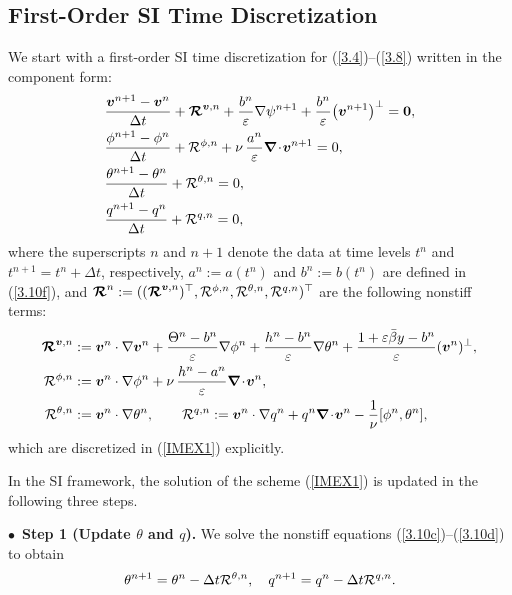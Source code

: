 \documentclass[a4paper,11pt,twoside]{article}
\numberwithin{equation}{section}
\numberwithin{figure}{section}
\numberwithin{table}{section}
\newcommand{\bnabla}{\bm{\nabla}}
\newcommand{\eps}{\varepsilon}
\newcommand{\dt}{\Delta t}
\newcommand{\bv}{\bm{v}}
\newcommand\eref[1]{(\ref{#1})}
\begin{document}
\subsection{First-Order SI Time Discretization}\label{sec32}
We start with a first-order SI time discretization for \eref{3.4}--\eref{3.8} written in the component form:
\begin{subequations}
\begin{align}
&\frac{\bv^{n+1}-\bv^n}{\dt}+\bm{{\cal R}}^{\bv,n}+\frac{b^n}{\eps}\nabla\psi^{n+1}+\frac{b^n}{\eps}\big(\bv^{n+1}\big)^\perp=\bm0,
\label{3.10a}\\
&\frac{\phi^{n+1}-\phi^n}{\dt}+{\cal R}^{\phi,n}+\nu\,\frac{a^n}{\eps}\bnabla\!\cdot\!\bv^{n+1}=0,\label{3.10b}\\
&\frac{\theta^{n+1}-\theta^n}{\dt}+{\cal R}^{\theta,n}=0,\label{3.10c}\\
&\frac{q^{n+1}-q^n}{\dt}+{\cal R}^{q,n}=0,\label{3.10d}
\end{align}
\label{IMEX1}
\end{subequations}
where the superscripts $n$ and $n+1$ denote the data at time levels $t^n$ and $t^{n+1}=t^n+\dt$, respectively, $a^n:=a(t^n)$ and
$b^n:=b(t^n)$ are defined in \eref{3.10f}, and $\bm{{\cal R}}^n:=((\bm{{\cal R}}^{\bv,n})^\top,{\cal R}^{\phi,n},{\cal R}^{\theta,n},
{\cal R}^{q,n})^\top$ are the following nonstiff terms:
\begin{equation}
\begin{aligned}
\bm{{\cal R}}^{\bv,n}&:=\bv^n\cdot\nabla\bv^n+\frac{\Theta^n-b^n}{\eps}\nabla\phi^n+\frac{h^n-b^n}{\eps}\nabla\theta^n+
\frac{1+\eps\bar{\beta}y-b^n}{\eps}(\bv^n)^\perp,\\
{\cal R}^{\phi,n}&:=\bv^n\cdot\nabla\phi^n+\nu\,\frac{h^n-a^n}{\eps}\bnabla\!\cdot\!\bv^n,\\
{\cal R}^{\theta,n}&:=\bv^n\cdot\nabla\theta^n,\qquad{\cal R}^{q,n}:=\bv^n\cdot\nabla q^n+q^n\bnabla\!\cdot\!\bv^n-
\frac{1}{\nu}[\phi^n,\theta^n],
\end{aligned}
\label{3.11}
\end{equation}
which are discretized in \eref{IMEX1} explicitly. 

In the SI framework, the solution of the scheme \eref{IMEX1} is updated in the following three steps.

\smallskip
\noindent
$\bullet\,$ \textbf{Step 1 (Update $\theta$ and $q$).} We solve the nonstiff equations \eref{3.10c}--\eref{3.10d} to obtain 
$$
\theta^{n+1}=\theta^n-\dt{\cal R}^{\theta,n},\quad q^{n+1}=q^n-\dt{\cal R}^{q,n}.
$$
\end{document}
